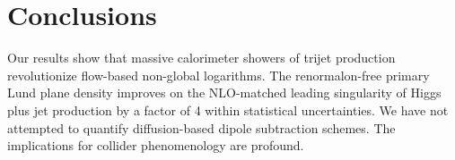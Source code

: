 \section{Conclusions}\label{sec:conclusions}

Our results show that massive calorimeter showers of trijet production
revolutionize flow-based non-global logarithms. The renormalon-free
primary Lund plane density improves on the NLO-matched leading
singularity of Higgs plus jet production by a factor of 4 within
statistical uncertainties. We have not attempted to quantify
diffusion-based dipole subtraction schemes. The implications for
collider phenomenology are profound.

